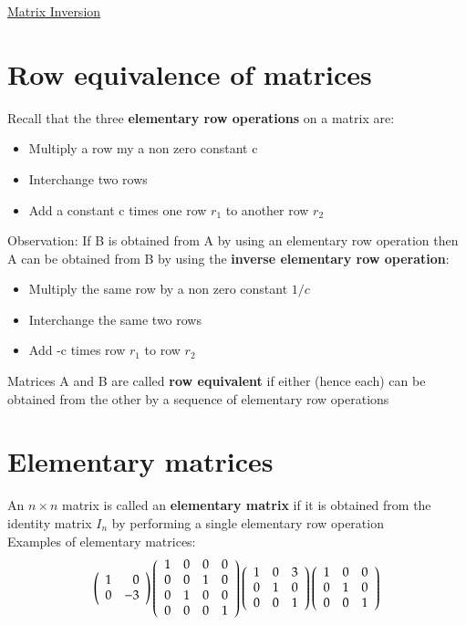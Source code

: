 \documentclass{article}[18pt]
\begin{document}
\begin{center}
\underline{\huge Matrix Inversion}
\end{center}

\section{Row equivalence of matrices}
Recall that the three \textbf{elementary row operations} on a matrix are:
\begin{itemize}
	\item Multiply a row my a non zero constant c
	\item Interchange two rows
	\item Add a constant c times one row $r_1$ to another row $r_2$
\end{itemize}
Observation: If B is obtained from A by using an elementary row operation then A can be obtained from B by using the \textbf{inverse elementary row operation}:
\begin{itemize}
	\item Multiply the same row by a non zero constant $1/c$
	\item Interchange the same two rows
	\item Add -c times row $r_1$ to row $r_2$
\end{itemize}
Matrices A and B are called \textbf{row equivalent} if either (hence each) can be obtained from the other by a sequence of elementary row operations
\section{Elementary matrices}
An $n\times n$ matrix is called an \textbf{elementary matrix} if it is obtained from the identity matrix $I_n$ by performing a single elementary row operation\\
Examples of elementary matrices:
$$\left( \begin{array} { r r } { 1 } & { 0 } \\ { 0 } & { - 3 } \end{array} \right) \left( \begin{array} { c c c c } { 1 } & { 0 } & { 0 } & { 0 } \\ { 0 } & { 0 } & { 1 } & { 0 } \\ { 0 } & { 1 } & { 0 } & { 0 } \\ { 0 } & { 0 } & { 0 } & { 1 } \end{array} \right) \left( \begin{array} { l l l } { 1 } & { 0 } & { 3 } \\ { 0 } & { 1 } & { 0 } \\ { 0 } & { 0 } & { 1 } \end{array} \right) \left( \begin{array} { l l l } { 1 } & { 0 } & { 0 } \\ { 0 } & { 1 } & { 0 } \\ { 0 } & { 0 } & { 1 } \end{array} \right)$$
\end{document}
